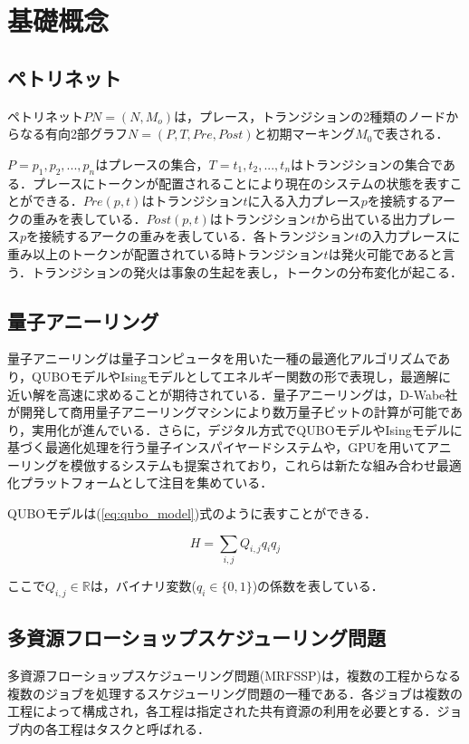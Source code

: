 \chapter{基礎概念}
\label{chap:concept}

\section{ペトリネット}
ペトリネット$PN = (N,M_o)$は，プレース，トランジションの2種類のノードからなる有向2部グラフ$N = (P,T,Pre,Post)$と初期マーキング$M_0$で表される．\cite{murata}

$P = {p_1, p_2, ..., p_n}$はプレースの集合，$T = {t_1, t_2, ..., t_n}$はトランジションの集合である．プレースにトークンが配置されることにより現在のシステムの状態を表すことができる．$Pre(p,t)$はトランジション$t$に入る入力プレース$p$を接続するアークの重みを表している．$Post(p,t)$はトランジション$t$から出ている出力プレース$p$を接続するアークの重みを表している．各トランジション$t$の入力プレースに重み以上のトークンが配置されている時トランジション$t$は発火可能であると言う．トランジションの発火は事象の生起を表し，トークンの分布変化が起こる．

\section{量子アニーリング}
量子アニーリングは量子コンピュータを用いた一種の最適化アルゴリズムであり，QUBOモデルやIsingモデルとしてエネルギー関数の形で表現し，最適解に近い解を高速に求めることが期待されている．量子アニーリングは，D-Wabe社が開発して商用量子アニーリングマシンにより数万量子ビットの計算が可能であり，実用化が進んでいる．さらに，デジタル方式でQUBOモデルやIsingモデルに基づく最適化処理を行う量子インスパイヤードシステムや，GPUを用いてアニーリングを模倣するシステムも提案されており，これらは新たな組み合わせ最適化プラットフォームとして注目を集めている．

QUBOモデルは(\ref{eq:qubo_model})式のように表すことができる．

\begin{equation}
H = \sum_{i,j} Q_{i,j}q_i q_j
\label{eq:qubo_model}
\end{equation}

ここで$Q_{i,j}\in \mathbb{R}$は，バイナリ変数($q_i \in \{0,1\}$)の係数を表している．

\section{多資源フローショップスケジューリング問題}
多資源フローショップスケジューリング問題(MRFSSP)は，複数の工程からなる複数のジョブを処理するスケジューリング問題の一種である．各ジョブは複数の工程によって構成され，各工程は指定された共有資源の利用を必要とする．ジョブ内の各工程はタスクと呼ばれる．

